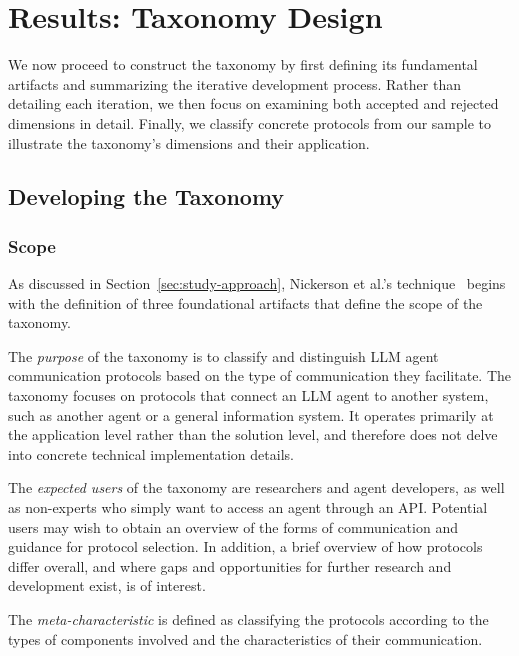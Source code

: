 \documentclass[pdflatex,sn-mathphys-num]{sn-jnl}%
\theoremstyle{thmstyleone}%
\theoremstyle{thmstyletwo}%
\theoremstyle{thmstylethree}%
\begin{document}
\section{Results: Taxonomy Design} \label{sec:taxonomy-design}

We now proceed to construct the taxonomy by first defining its fundamental artifacts and summarizing the iterative development process. Rather than detailing each iteration, we then focus on examining both accepted and rejected dimensions in detail. Finally, we classify concrete protocols from our sample to illustrate the taxonomy's dimensions and their application.
\subsection{Developing the Taxonomy}
\label{sec:taxonomy-design-developing-the-taxonomy}

\subsubsection{Scope} 

As discussed in Section~\ref{sec:study-approach}, Nickerson et al.'s technique~\cite{nickerson2013method} begins with the definition of three foundational artifacts that define the scope of the taxonomy.

The \textit{purpose} of the taxonomy is to classify and distinguish LLM agent communication protocols based on the type of communication they facilitate. The taxonomy focuses on protocols that connect an LLM agent to another system, such as another agent or a general information system. It operates primarily at the application level rather than the solution level, and therefore does not delve into concrete technical implementation details.

The \textit{expected users} of the taxonomy are researchers and agent developers, as well as non-experts who simply want to access an agent through an API. Potential users may wish to obtain an overview of the forms of communication and guidance for protocol selection. In addition, a brief overview of how protocols differ overall, and where gaps and opportunities for further research and development exist, is of interest.

The \textit{meta-characteristic} is defined as classifying the protocols according to the types of components involved and the characteristics of their communication.
\end{document}

